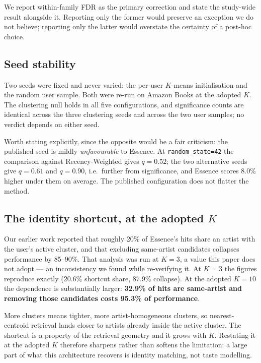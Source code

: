 \documentclass[runningheads]{llncs}
\begin{document}
We report within-family FDR as the primary correction and state the study-wide result
alongside it. Reporting only the former would preserve an exception we do not believe;
reporting only the latter would overstate the certainty of a post-hoc choice.

\subsection{Seed stability}\label{sec:seeds}

Two seeds were fixed and never varied: the per-user $K$-means initialisation and the random
user sample. Both were re-run on Amazon Books at the adopted $K$. The clustering null holds in
all five configurations, and significance counts are identical across the three clustering
seeds and across the two user samples; no verdict depends on either seed.

Worth stating explicitly, since the opposite would be a fair criticism: the published seed is
mildly \emph{unfavourable} to Essence. At \texttt{random\_state=42} the comparison against
Recency-Weighted gives $q = 0.52$; the two alternative seeds give $q = 0.61$ and
$q = 0.90$, i.e.\ further from significance, and Essence scores 8.0\% higher under them
on average. The published configuration does not flatter the method.

\subsection{The identity shortcut, at the adopted \texorpdfstring{$K$}{K}}\label{sec:shortcut}

Our earlier work reported that roughly 20\% of Essence's hits share an artist with the user's
active cluster, and that excluding same-artist candidates collapses performance by 85--90\%.
That analysis was run at $K = 3$, a value this paper does not adopt --- an inconsistency we
found while re-verifying it. At $K = 3$ the figures reproduce exactly (20.6\% shortcut share,
87.9\% collapse). At the adopted $K = 10$ the dependence is substantially larger:
\textbf{32.9\% of hits are same-artist and removing those candidates costs 95.3\% of
performance}.

More clusters means tighter, more artist-homogeneous clusters, so nearest-centroid retrieval
lands closer to artists already inside the active cluster. The shortcut is a property of the
retrieval geometry and it grows with $K$. Restating it at the adopted $K$ therefore sharpens
rather than softens the limitation: a large part of what this architecture recovers is
identity matching, not taste modelling.
\end{document}
